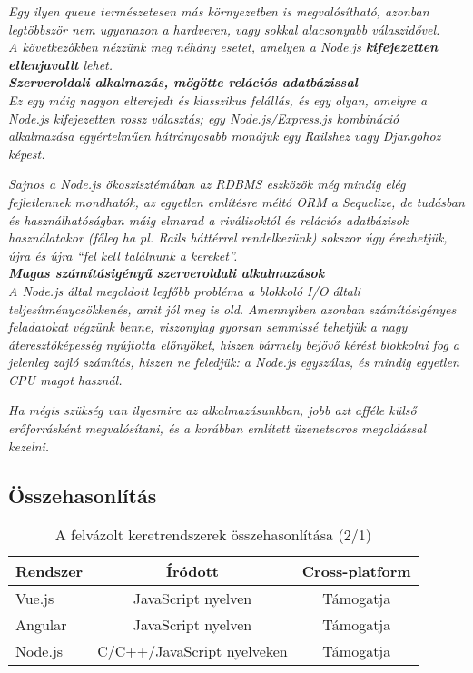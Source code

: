 \textit{Egy ilyen queue természetesen más környezetben is megvalósítható, azonban legtöbbször nem ugyanazon a hardveren, vagy sokkal alacsonyabb válaszidővel.}\\

\textit{A következőkben nézzünk meg néhány esetet, amelyen a Node.js \textbf{kifejezetten ellenjavallt} lehet.}\\

\noindent\textit{\textbf{Szerveroldali alkalmazás, mögötte relációs adatbázissal}}\\

\textit{Ez egy máig nagyon elterejedt és klasszikus felállás, és egy olyan, amelyre a Node.js kifejezetten rossz választás; egy Node.js/Express.js kombináció alkalmazása egyértelműen hátrányosabb mondjuk egy Railshez vagy Djangohoz képest.}

\textit{Sajnos a Node.js ökoszisztémában az RDBMS eszközök még mindig elég fejletlennek mondhatók, az egyetlen említésre méltó ORM a Sequelize, de tudásban és használhatóságban máig elmarad a riválisoktól és relációs adatbázisok használatakor (főleg ha pl. Rails háttérrel rendelkezünk) sokszor úgy érezhetjük, újra és újra “fel kell találnunk a kereket”.}\\

\noindent\textit{\textbf{Magas számításigényű szerveroldali alkalmazások}}\\

\textit{A Node.js által megoldott legfőbb probléma a blokkoló I/O általi teljesítménycsökkenés, amit jól meg is old. Amennyiben azonban számításigényes feladatokat végzünk benne, viszonylag gyorsan semmissé tehetjük a nagy áteresztőképesség nyújtotta előnyöket, hiszen bármely bejövő kérést blokkolni fog a jelenleg zajló számítás, hiszen ne feledjük: a Node.js egyszálas, és mindig egyetlen CPU magot használ.}

\textit{Ha mégis szükség van ilyesmire az alkalmazásunkban, jobb azt afféle külső erőforrásként megvalósítani, és a korábban említett üzenetsoros megoldással kezelni.}


\subsection{Összehasonlítás}

\begin{table}[h]
\centering
\caption{A felvázolt keretrendszerek összehasonlítása (2/1)}
\label{tab:keretrendszerek1}
\begin{tabular}{|l|c|c|}
\hline
Rendszer & Íródott & Cross-platform\\
\hline
Vue.js & JavaScript nyelven & Támogatja\\
\hline
Angular & JavaScript nyelven & Támogatja\\
\hline
Node.js & C/C++/JavaScript nyelveken & Támogatja\\
\hline
\end{tabular}
\end{table}

